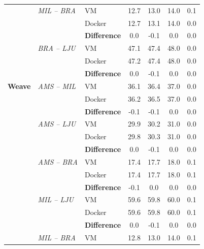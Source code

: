 \begin{appendices}
\begin{longtable}{@{\extracolsep{\fill}}lllcccc@{}}
 & \textit{MIL – BRA} & {\color[HTML]{333333} VM} & 12.7 & 13.0 & 14.0 & 0.1 \\
 &  & {\color[HTML]{333333} Docker} & 12.7 & 13.1 & 14.0 & 0.0 \\ \cmidrule(l){3-7} 
 &  & {\color[HTML]{333333} \textbf{Difference}} & 0.0 & {\color[HTML]{CB0000} -0.1} & 0.0 & 0.0 \\ \cmidrule(l){2-7} 
 & \textit{BRA – LJU} & {\color[HTML]{333333} VM} & 47.1 & 47.4 & 48.0 & 0.0 \\
 &  & {\color[HTML]{333333} Docker} & 47.2 & 47.4 & 48.0 & 0.0 \\ \cmidrule(l){3-7} 
 &  & {\color[HTML]{333333} \textbf{Difference}} & 0.0 & {\color[HTML]{CB0000} -0.1} & 0.0 & 0.0 \\ \midrule
\textbf{Weave} & \textit{AMS – MIL} & {\color[HTML]{333333} VM} & 36.1 & 36.4 & 37.0 & 0.0 \\
 &  & {\color[HTML]{333333} Docker} & 36.2 & 36.5 & 37.0 & 0.0 \\ \cmidrule(l){3-7} 
 &  & {\color[HTML]{333333} \textbf{Difference}} & {\color[HTML]{CB0000} -0.1} & {\color[HTML]{CB0000} -0.1} & 0.0 & 0.0 \\ \cmidrule(l){2-7} 
 & \textit{AMS – LJU} & {\color[HTML]{333333} VM} & 29.9 & 30.2 & 31.0 & 0.0 \\
 &  & {\color[HTML]{333333} Docker} & 29.8 & 30.3 & 31.0 & 0.0 \\ \cmidrule(l){3-7} 
 &  & {\color[HTML]{333333} \textbf{Difference}} & 0.0 & {\color[HTML]{CB0000} -0.1} & 0.0 & 0.0 \\ \cmidrule(l){2-7} 
 & \textit{AMS – BRA} & {\color[HTML]{333333} VM} & 17.4 & 17.7 & 18.0 & 0.1 \\
 & \textit{} & {\color[HTML]{333333} Docker} & 17.4 & 17.7 & 18.0 & 0.1 \\ \cmidrule(l){3-7} 
 & \textit{} & {\color[HTML]{333333} \textbf{Difference}} & {\color[HTML]{CB0000} -0.1} & 0.0 & 0.0 & 0.0 \\ \cmidrule(l){2-7} 
 & \textit{MIL – LJU} & {\color[HTML]{333333} VM} & 59.6 & 59.8 & 60.0 & 0.1 \\
 & \textit{} & {\color[HTML]{333333} Docker} & 59.6 & 59.8 & 60.0 & 0.1 \\ \cmidrule(l){3-7} 
 & \textit{} & {\color[HTML]{333333} \textbf{Difference}} & 0.0 & {\color[HTML]{CB0000} -0.1} & 0.0 & 0.0 \\ \cmidrule(l){2-7} 
 & \textit{MIL – BRA} & {\color[HTML]{333333} VM} & 12.8 & 13.0 & 14.0 & 0.1 \\

\end{longtable}
\end{appendices}
